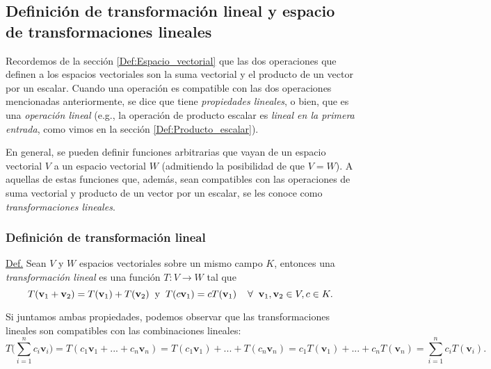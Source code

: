 \documentclass[12pt]{article}
\begin{document}
\subsection{Definición de transformación lineal y espacio de transformaciones lineales}

Recordemos de la sección \ref{Def:Espacio_vectorial} que las dos operaciones que definen a los espacios vectoriales son la suma vectorial y el producto de un vector por un escalar. Cuando una operación es compatible con las dos operaciones mencionadas anteriormente, se dice que tiene \emph{propiedades lineales}, o bien, que es una \emph{operación lineal} (e.g., la operación de producto escalar es \emph{lineal en la primera entrada}, como vimos en la sección \ref{Def:Producto_escalar}). 

En general, se pueden definir funciones arbitrarias que vayan de un espacio vectorial $V$ a un espacio vectorial $W$ (admitiendo la posibilidad de que $V=W$). A aquellas de estas funciones que, además, sean compatibles con las operaciones de suma vectorial y producto de un vector por un escalar, se les conoce como \emph{transformaciones lineales}.

\subsubsection{Definición de transformación lineal}

\vspace{5mm}
\begin{tcolorbox} \label{Def:Transformación_lineal} 
    \underline{Def.} Sean $V$ y $W$ espacios vectoriales sobre un mismo campo $K$, entonces una \emph{transformación lineal} es una función $T:V\to W$ tal que $$T(\mathbf{v}_1+\mathbf{v}_2)=T(\mathbf{v}_1)+T(\mathbf{v}_2) \hspace{2mm}\text{y}\hspace{2mm} T(c\mathbf{v}_1)=cT(\mathbf{v}_1)\hspace{4mm}\forall\hspace{2mm} \mathbf{v}_1, \mathbf{v}_2\in V, c\in K.$$

    Si juntamos ambas propiedades, podemos observar que las transformaciones lineales son compatibles con las combinaciones lineales: $$T\big ( \sum_{i=1}^n c_i\mathbf{v}_i \big ) = T(c_1\mathbf{v}_1+...+c_n\mathbf{v}_n)=T(c_1\mathbf{v}_1)+...+T(c_n\mathbf{v}_n)=c_1 T(\mathbf{v}_1)+...+c_n T(\mathbf{v}_n)=\sum_{i=1}^n c_i T(\mathbf{v}_i).$$
\end{tcolorbox}
\end{document}
